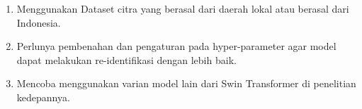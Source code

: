 \begin{enumerate}[nolistsep]

  \item Menggunakan Dataset citra yang berasal dari daerah lokal atau berasal dari Indonesia.

  \item Perlunya pembenahan dan pengaturan pada hyper-parameter agar model dapat melakukan 
  re-identifikasi dengan lebih baik.

  \item Mencoba menggunakan varian model lain dari Swin Transformer di penelitian kedepannya.

\end{enumerate}
